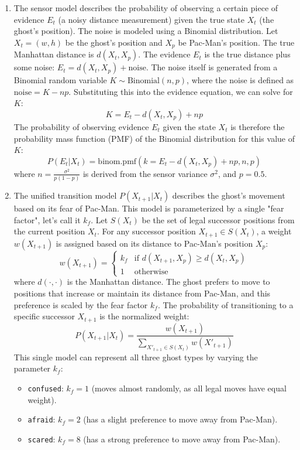 \begin{enumerate}[label=\alph*.,leftmargin=*]
    \item The sensor model describes the probability of observing a certain piece of evidence $E_t$ (a noisy distance measurement) given the true state $X_t$ (the ghost's position). The noise is modeled using a Binomial distribution. Let $X_t = (w, h)$ be the ghost's position and $X_p$ be Pac-Man's position. The true Manhattan distance is $d(X_t, X_p)$. The evidence $E_t$ is the true distance plus some noise: $E_t = d(X_t, X_p) + \text{noise}$. The noise itself is generated from a Binomial random variable $K \sim \text{Binomial}(n, p)$, where the noise is defined as $\text{noise} = K - np$. Substituting this into the evidence equation, we can solve for $K$:
    $$ K = E_t - d(X_t, X_p) + np $$
    The probability of observing evidence $E_t$ given the state $X_t$ is therefore the probability mass function (PMF) of the Binomial distribution for this value of $K$:
    $$ P(E_t | X_t) = \text{binom.pmf}(k=E_t - d(X_t, X_p) + np, n, p) $$
    where $n = \frac{\sigma^2}{p(1-p)}$ is derived from the sensor variance $\sigma^2$, and $p=0.5$.
    \item The unified transition model $P(X_{t+1} | X_t)$ describes the ghost's movement based on its fear of Pac-Man. This model is parameterized by a single "fear factor", let's call it $k_f$. Let $S(X_t)$ be the set of legal successor positions from the current position $X_t$. For any successor position $X_{t+1} \in S(X_t)$, a weight $w(X_{t+1})$ is assigned based on its distance to Pac-Man's position $X_p$:
    $$
    w(X_{t+1}) =
    \begin{cases}
        k_f & \text{if } d(X_{t+1}, X_p) \ge d(X_t, X_p) \\
        1 & \text{otherwise}
    \end{cases}
    $$
    where $d(\cdot, \cdot)$ is the Manhattan distance. The ghost prefers to move to positions that increase or maintain its distance from Pac-Man, and this preference is scaled by the fear factor $k_f$. The probability of transitioning to a specific successor $X_{t+1}$ is the normalized weight:
    $$ P(X_{t+1} | X_t) = \frac{w(X_{t+1})}{\sum_{X'_{t+1} \in S(X_t)} w(X'_{t+1})} $$
    This single model can represent all three ghost types by varying the parameter $k_f$:
    \begin{itemize}
        \item \texttt{confused}: $k_f = 1$ (moves almost randomly, as all legal moves have equal weight).
        \item \texttt{afraid}: $k_f = 2$ (has a slight preference to move away from Pac-Man).
        \item \texttt{scared}: $k_f = 8$ (has a strong preference to move away from Pac-Man).
    \end{itemize}
\end{enumerate}

